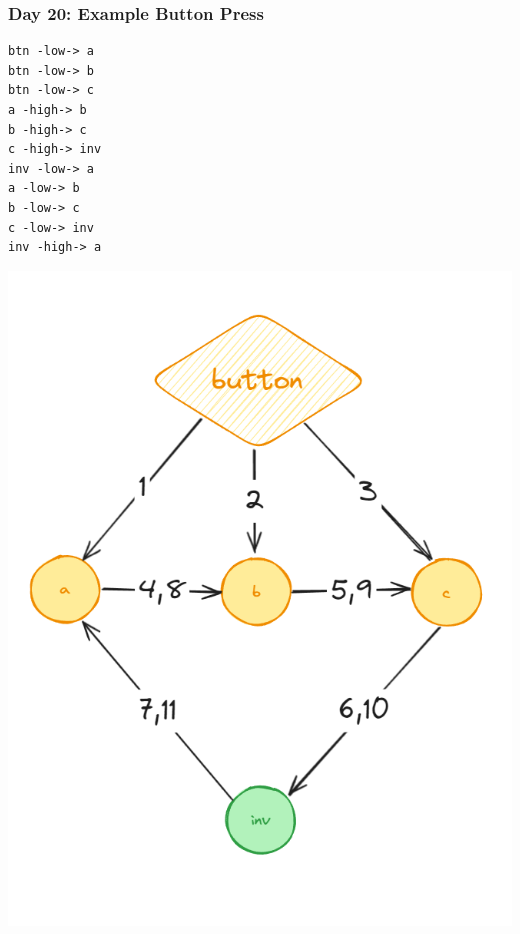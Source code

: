 \begin{frame}[fragile]
\frametitle{Day 20: Example Button Press}

    \begin{center}
        \begin{minipage}{0.45\textwidth}
            \begin{center}
                \begin{verbatim}
btn -low-> a
btn -low-> b
btn -low-> c
a -high-> b
b -high-> c
c -high-> inv
inv -low-> a
a -low-> b
b -low-> c
c -low-> inv
inv -high-> a      
                \end{verbatim}
            \end{center}
        \end{minipage}
        \begin{minipage}{0.45\textwidth}
            \begin{center}
                \includegraphics[width=\textwidth]{Day20ExampleGraph}
            \end{center}
        \end{minipage}
    \end{center}

\end{frame}

